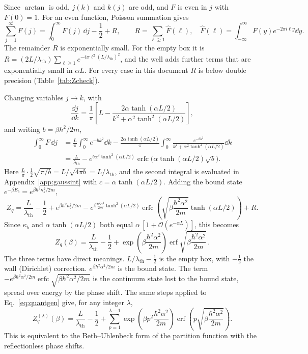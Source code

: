 \documentclass[11pt]{article}
\numberwithin{equation}{section}
\providecommand{\erf}{\operatorname{erf}}
\providecommand{\erfc}{\operatorname{erfc}}
\newcommand{\lth}{\lambda_{\mathrm{th}}}
\begin{document}
Since $\arctan$ is odd, $j(k)$ and $k(j)$ are odd, and $F$ is even in $j$ with $F(0)=1$. For an even function, Poisson summation gives
\begin{equation}
\sum_{j=1}^{\infty}F(j)=\int_0^\infty F(j)\,\dd j-\frac12+R,\qquad R=\sum_{\ell\ge1}\hat F(\ell),\quad\hat F(\ell)=\int_{-\infty}^{\infty}F(y)e^{-2\pi i\ell y}\dd y .
\label{eq:poisson}
\end{equation}
The remainder $R$ is exponentially small. For the empty box it is $R=(2L/\lth)\sum_{\ell\ge1}e^{-4\pi\ell^2(L/\lth)^2}$, and the well adds further terms that are exponentially small in $\alpha L$. For every case in this document $R$ is below double precision (Table~\ref{tab:Zcheck}).

Changing variables $j\to k$, with
\[
\frac{\dd j}{\dd k}=\frac1\pi\left[L-\frac{2\alpha\tanh(\alpha L/2)}{k^2+\alpha^2\tanh^2(\alpha L/2)}\right],
\]
and writing $b=\beta\hbar^2/2m$,
\begin{align}
\int_0^\infty F\,\dd j&=\frac{L}{\pi}\int_0^\infty e^{-bk^2}\dd k-\frac{2\alpha\tanh(\alpha L/2)}{\pi}\int_0^\infty\frac{e^{-bk^2}}{k^2+\alpha^2\tanh^2(\alpha L/2)}\dd k\nonumber\\
&=\frac{L}{\lth}-e^{b\alpha^2\tanh^2(\alpha L/2)}\erfc\!\big(\alpha\tanh(\alpha L/2)\sqrt b\big).
\end{align}
Here $\frac{L}{\pi}\cdot\frac12\sqrt{\pi/b}=L/\sqrt{4\pi b}=L/\lth$, and the second integral is evaluated in Appendix~\ref{app:gaussint} with $c=\alpha\tanh(\alpha L/2)$. Adding the bound state $e^{-\beta E_b}=e^{\beta\hbar^2\kappa_b^2/2m}$,
\begin{equation}
Z_q=\frac{L}{\lth}-\frac12+e^{\beta\hbar^2\kappa_b^2/2m}-e^{\beta\frac{\hbar^2\alpha^2}{2m}\tanh^2(\alpha L/2)}\erfc\!\left(\sqrt{\beta\frac{\hbar^2\alpha^2}{2m}}\tanh(\alpha L/2)\right)+R .
\end{equation}
Since $\kappa_b$ and $\alpha\tanh(\alpha L/2)$ both equal $\alpha\,[1+\mathcal O(e^{-\alpha L})]$, this becomes
\begin{equation}
\boxed{\;Z_q(\beta)=\frac{L}{\lth}-\frac12+\exp\!\left(\beta\frac{\hbar^2\alpha^2}{2m}\right)\erf\!\sqrt{\beta\frac{\hbar^2\alpha^2}{2m}}\,.\;}
\label{eq:Zqclosed}
\end{equation}
The three terms have direct meanings. $L/\lth-\tfrac12$ is the empty box, with $-\tfrac12$ the wall (Dirichlet) correction. $e^{\beta\hbar^2\alpha^2/2m}$ is the bound state. The term $-e^{\beta\hbar^2\alpha^2/2m}\erfc\sqrt{\beta\hbar^2\alpha^2/2m}$ is the continuum state lost to the bound state, spread over energy by the phase shift. The same steps applied to Eq.~\eqref{eq:quantgen} give, for any integer $\lambda$,
\begin{equation}
Z_q^{(\lambda)}(\beta)=\frac{L}{\lth}-\frac12+\sum_{p=1}^{\lambda-1}\exp\!\left(\beta p^2\frac{\hbar^2\alpha^2}{2m}\right)\erf\!\left(p\sqrt{\beta\frac{\hbar^2\alpha^2}{2m}}\right).
\label{eq:Zqgen}
\end{equation}
This is equivalent to the Beth--Uhlenbeck form of the partition function \cite{bethuhlenbeck1937} with the reflectionless phase shifts.
\end{document}
